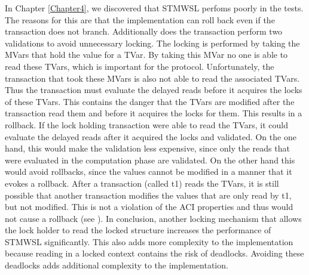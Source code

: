 In Chapter \ref{Chapter4}, we discovered that STMWSL perfoms poorly in the tests. The reasons for this are 
that the implementation can roll back even if the transaction does not branch. Additionally does the 
transaction perform two validations to avoid unnecessary locking. The locking is performed by taking
the MVars that hold the value for a TVar. By taking this MVar no one is able to read these TVars, which 
is important for the protocol. Unfortunately, the transaction that took these MVars is also not able to read 
the associated TVars. Thus the transaction must evaluate the delayed reads before it acquires the locks of these 
TVars. This contains the danger that the TVars are modified after the transaction read them and before
it acquires the locks for them. This results in a rollback. If the lock holding transaction were able 
to read the TVars, it could evaluate the delayed reads after it acquired the locks and validated. On the
one hand, this would make the validation less expensive, since only the reads that were evaluated in the 
computation phase are validated. On the other hand this would avoid rollbacks, since the values cannot 
be modified in a manner that it evokes a rollback. After a transaction (called t1) reads the TVars, it is 
still possible that another transaction modifies the values that are only read by t1, but not modified.
This is not a violation of the ACI properties and thus would not cause a rollback (see \parencite{lockfreedom}).
In conclusion, another locking mechanism that allows the lock holder to read the locked structure
increases the performance of STMWSL significantly. This also adds more complexity to the implementation
because reading in a locked context contains the risk of deadlocks. Avoiding these deadlocks adds 
additional complexity to the implementation.

